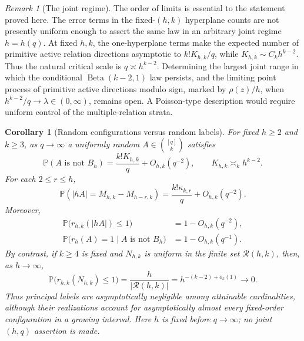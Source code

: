 \documentclass[11pt,reqno]{amsart}
\newtheorem{corollary}[theorem]{Corollary}
\theoremstyle{definition}
\theoremstyle{remark}
\newtheorem{remark}[theorem]{Remark}
\newcommand{\Rcal}{\mathcal R}
\begin{document}
\begin{remark}[The joint regime]
The order of limits is essential to the statement proved here.  The error
terms in the fixed-$(h,k)$ hyperplane counts are not presently uniform
enough to assert the same law in an arbitrary joint regime $h=h(q)$.  At
fixed $h,k$, the one-hyperplane terms make the expected number of primitive
active relation directions asymptotic to $k!K_{h,k}/q$, while
$K_{h,k}\sim C_kh^{k-2}$.  Thus the natural critical scale is
$q\asymp h^{k-2}$.  Determining the largest joint range in which the
conditional $\operatorname{Beta}(k-2,1)$ law persists, and the limiting point
process of primitive active directions modulo sign, marked by $\rho(z)/h$,
when $h^{k-2}/q\to\lambda\in(0,\infty)$, remains open.  A Poisson-type
description would require uniform control of the multiple-relation strata.
\end{remark}

\begin{corollary}[Random configurations versus random labels]
\label{cor:label-configuration-reversal}
For fixed $h\geq2$ and $k\geq3$, as $q\to\infty$ a uniformly random
$A\in\binom{[q]}k$ satisfies
\[
 \mathbb P(A\text{ is not }B_h)
 =\frac{k!K_{h,k}}q+O_{h,k}(q^{-2}),
 \qquad K_{h,k}\asymp_k h^{k-2}.
\]
For each $2\leq r\leq h$,
\[
 \mathbb P(|hA|=M_{h,k}-M_{h-r,k})
 =\frac{k!\kappa_{k,r}}q+O_{h,k}(q^{-2}).
\]
Moreover,
\begin{equation}\label{eq:random-configuration-principal}
 \begin{aligned}
  \mathbb P\bigl(r_{h,k}(|hA|)\leq1\bigr)
   &=1-O_{h,k}(q^{-2}),\\
  \mathbb P\bigl(r_h(A)=1\mid A\text{ is not }B_h\bigr)
   &=1-O_{h,k}(q^{-1}).
 \end{aligned}
\end{equation}
By contrast, if $k\geq4$ is fixed and $N_{h,k}$ is uniform in the finite set
$\Rcal(h,k)$, then, as $h\to\infty$,
\begin{equation}\label{eq:random-label-nonprincipal}
 \mathbb P\bigl(r_{h,k}(N_{h,k})\leq1\bigr)
 =\frac{h}{|\Rcal(h,k)|}
 =h^{-(k-2)+o_k(1)}\longrightarrow0.
\end{equation}
Thus principal labels are asymptotically negligible among attainable
cardinalities, although their realizations account for asymptotically almost
every fixed-order configuration in a growing interval.
Here $h$ is fixed before $q\to\infty$;
no joint $(h,q)$ assertion is made.
\end{corollary}
\end{document}
